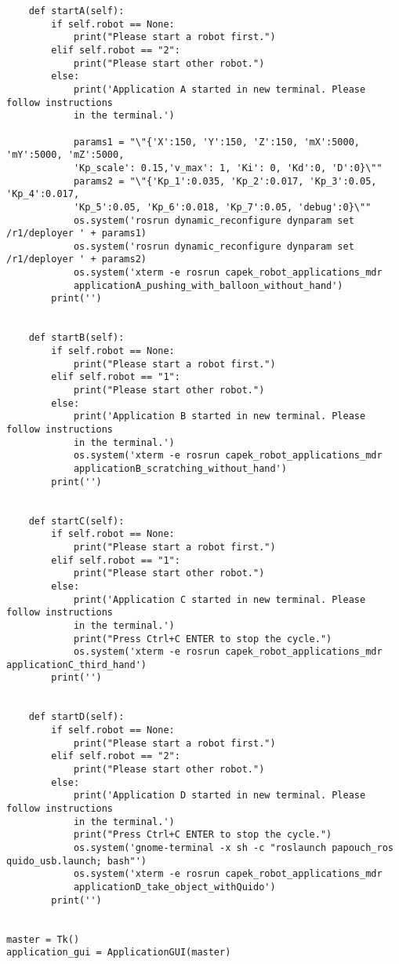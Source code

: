 \begin{lstlisting}
	def startA(self):
		if self.robot == None:
			print("Please start a robot first.")
		elif self.robot == "2":
			print("Please start other robot.")
		else:
			print('Application A started in new terminal. Please follow instructions
			in the terminal.')

			params1 = "\"{'X':150, 'Y':150, 'Z':150, 'mX':5000, 'mY':5000, 'mZ':5000,
			'Kp_scale': 0.15,'v_max': 1, 'Ki': 0, 'Kd':0, 'D':0}\""
			params2 = "\"{'Kp_1':0.035, 'Kp_2':0.017, 'Kp_3':0.05, 'Kp_4':0.017, 
			'Kp_5':0.05, 'Kp_6':0.018, 'Kp_7':0.05, 'debug':0}\""
			os.system('rosrun dynamic_reconfigure dynparam set /r1/deployer ' + params1)
			os.system('rosrun dynamic_reconfigure dynparam set /r1/deployer ' + params2)
			os.system('xterm -e rosrun capek_robot_applications_mdr 
			applicationA_pushing_with_balloon_without_hand')
		print('')


	def startB(self):
		if self.robot == None:
			print("Please start a robot first.")
		elif self.robot == "1":
			print("Please start other robot.")
		else:
			print('Application B started in new terminal. Please follow instructions
			in the terminal.')
			os.system('xterm -e rosrun capek_robot_applications_mdr 
			applicationB_scratching_without_hand')
		print('')


	def startC(self):
		if self.robot == None:
			print("Please start a robot first.")
		elif self.robot == "1":
			print("Please start other robot.")
		else:
			print('Application C started in new terminal. Please follow instructions
			in the terminal.')
			print("Press Ctrl+C ENTER to stop the cycle.")
			os.system('xterm -e rosrun capek_robot_applications_mdr applicationC_third_hand')
		print('')


	def startD(self):
		if self.robot == None:
			print("Please start a robot first.")
		elif self.robot == "2":
			print("Please start other robot.")
		else:
			print('Application D started in new terminal. Please follow instructions
			in the terminal.')
			print("Press Ctrl+C ENTER to stop the cycle.")
			os.system('gnome-terminal -x sh -c "roslaunch papouch_ros quido_usb.launch; bash"')
			os.system('xterm -e rosrun capek_robot_applications_mdr 
			applicationD_take_object_withQuido')
		print('')


master = Tk()
application_gui = ApplicationGUI(master)
\end{lstlisting}
